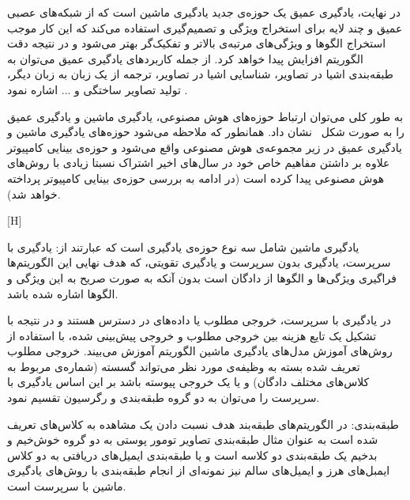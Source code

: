 در نهایت، یادگیری عمیق یک حوزه‌ی جدید یادگیری ماشین است که از شبکه‌های عصبی عمیق و چند لایه برای استخراج ویژگی و تصمیم‌گیری استفاده می‌کند که این کار موجب استخراج الگوها و ویژگی‌های مرتبه‌ی بالاتر و تفکیک‌گر بهتر می‌شود و در نتیجه دقت الگوریتم افزایش پیدا خواهد کرد. از جمله کاربرد‌های یادگیری عمیق می‌توان به طبقه‌بندی اشیا در تصاویر، شناسایی اشیا در تصاویر، ترجمه از یک زبان به زبان دیگر، تولید تصاویر ساختگی و ... اشاره نمود . 

به طور کلی می‌توان ارتباط حوزه‌های هوش مصنوعی، یادگیری ماشین و یادگیری عمیق را به صورت شکل~ نشان داد. همانطور که ملاحظه می‌شود حوزه‌های یادگیری ماشین و یادگیری عمیق در زیر مجموعه‌ی هوش مصنوعی واقع می‌شود و حوزه‌ی بینایی کامپیوتر علاوه بر داشتن مفاهیم خاص خود در سال‌های اخیر اشتراک نسبتا زیادی با روش‌های هوش مصنوعی پیدا کرده است (در ادامه به بررسی حوزه‌ی بینایی کامپیوتر پرداخته خواهد شد).

[H]


یادگیری ماشین شامل سه نوع حوزه‌ی یادگیری است که عبارتند از: یادگیری با سرپرست، یادگیری بدون سرپرست و یادگیری تقویتی، که هدف نهایی این الگوریتم‌ها فراگیری ویژگی‌ها و الگوها از دادگان است بدون آنکه به صورت صریح به این ویژگی‌ و الگوها اشاره شده باشد.

در یادگیری با سرپرست، خروجی مطلوب یا داده‌های  در دسترس هستند و در نتیجه با تشکیل یک تایع هزینه بین خروجی مطلوب و خروجی پیش‌بینی شده، با استفاده از روش‌های آموزش مدل‌های یادگیری ماشین الگوریتم آموزش می‌بیند. خروجی مطلوب تعریف شده بسته به وظیفه‌ی مورد نظر می‌تواند گسسته (شماره‌ی مربوط به کلاس‌های مختلف دادگان) و یا یک خروجی پیوسته باشد بر این اساس یادگیری با سرپرست را می‌توان به دو گروه طبقه‌بندی و رگرسیون تقسیم نمود.

 طبقه‌بندی: در الگوریتم‌های طبقه‌بند هدف نسبت دادن یک مشاهده‌ به کلاس‌های تعریف شده است به عنوان مثال طبقه‌بندی تصاویر تومور پوستی به دو گروه خوش‌خیم و بدخیم یک طبقه‌بندی دو کلاسه است و یا طبقه‌بندی ایمیل‌های دریافتی به دو کلاس‌ ایمبل‌های هرز و ایمیل‌های سالم نیز نمونه‌ای از انجام طبقه‌بندی با روش‌های یادگیری ماشین با سرپرست است.

